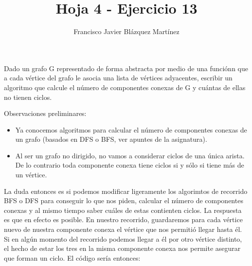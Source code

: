 \documentclass[12pt]{article}
\newenvironment{problem}[2][Problema]{\begin{trivlist}
\item[\hskip \labelsep {\bfseries #1}\hskip \labelsep {\bfseries #2.}]}{\end{trivlist}}
\begin{document}
 
\title{\textbf{Hoja 4 - Ejercicio 13}}
\author{Francisco Javier Blázquez Martínez}
\date{}
\maketitle
 
\begin{problem}{4.13.1}
Dado un grafo G representado de forma abstracta por medio de una funciónn que a cada
vértice del grafo le asocia una lista de vértices adyacentes, escribir un algoritmo
que calcule el número de componentes conexas de G y cuántas de ellas no tienen ciclos.
\end{problem}

\setlength{\parskip}{0mm}
Observaciones preliminares:

\begin{itemize}
    \item Ya conocemos algoritmos para calcular el número de componentes conexas de 
          un grafo (basados en DFS o BFS, ver apuntes de la asignatura).
    \item Al ser un grafo no dirigido, no vamos a considerar ciclos de una única 
          arista. De lo contrario toda componente conexa tiene ciclos si y sólo si 
          tiene más de un vértice.
\end{itemize}

La duda entonces es si podemos modificar ligeramente los algorimtos de recorrido BFS
o DFS para conseguir lo que nos piden, calcular el número de componentes conexas y al
mismo tiempo saber cuáles de estas contienten ciclos. La respuesta es que en efecto
es posible. En nuestro recorrido, guardaremos para cada vértice nuevo de nuestra 
componente conexa el vértice que nos permitió llegar hasta él. Si en algún momento del
recorrido podemos llegar a él por otro vértice distinto, el hecho de estar los tres
en la misma componente conexa nos permite asegurar que forman un ciclo. El código 
sería entonces:

\setlength{\parskip}{\baselineskip}
\end{document}
